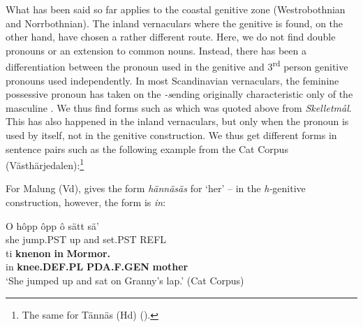 What has been said so far applies to the coastal genitive zone (Westrobothnian and Norrbothnian). The inland vernaculars where the genitive is found, on the other hand, have chosen a rather different route. Here, we do not find double pronouns or an extension to common nouns. Instead, there has been a differentiation between the pronoun used in the genitive and 3\textsuperscript{rd} person genitive pronouns used independently. In most Scandinavian vernaculars, the feminine possessive pronoun has taken on the\textit{ {}-s}\textstyleLinguisticExample{ }ending originally characteristic only of the masculine . We thus find forms such as  which was quoted above from \textit{Skelletmål}. This has also happened in the inland vernaculars, but only when the pronoun is used by itself, not in the genitive construction. We thus get different forms in sentence pairs such as the following example from the Cat Corpus (Västhärjedalen):\footnote{ The same for Tännäs (Hd) (\citet[22]{Olofsson1999}).}

\ea\label{}

\z 
\z

For Malung (Vd), \citet[2:211]{Levander1925} gives the form \textit{hännäsäs} for ‘her’ – in the \textit{h-}genitive construction, however, the form is \textit{in}: 


\ea\label{}
\gll O  hôpp  ôpp  ô  sätt  sä’  \\
she  jump.PST  up  and  set.PST  REFL  \\
\gll ti  \textbf{knenon} \textbf{in} \textbf{Mormor.}\\
in  \textbf{knee.DEF.PL} \textbf{PDA.F.GEN} \textbf{mother}\\
\glt ‘She jumped up and sat on Granny’s lap.’ (Cat Corpus)
\z

